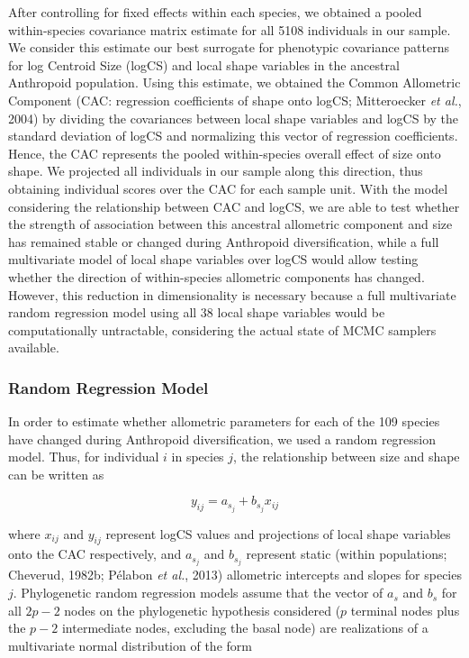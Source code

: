 \documentclass[12pt,twoside]{report}
\begin{document}
After controlling for fixed effects within each species, we obtained a
pooled within-species covariance matrix estimate for all 5108
individuals in our sample. We consider this estimate our best surrogate
for phenotypic covariance patterns for log Centroid Size (logCS) and
local shape variables in the ancestral Anthropoid population. Using this
estimate, we obtained the Common Allometric Component (CAC: regression
coefficients of shape onto logCS; Mitteroecker \emph{et al.}, 2004) by
dividing the covariances between local shape variables and logCS by the
standard deviation of logCS and normalizing this vector of regression
coefficients. Hence, the CAC represents the pooled within-species
overall effect of size onto shape. We projected all individuals in our
sample along this direction, thus obtaining individual scores over the
CAC for each sample unit. With the model considering the relationship
between CAC and logCS, we are able to test whether the strength of
association between this ancestral allometric component and size has
remained stable or changed during Anthropoid diversification, while a
full multivariate model of local shape variables over logCS would allow
testing whether the direction of within-species allometric components
has changed. However, this reduction in dimensionality is necessary
because a full multivariate random regression model using all 38 local
shape variables would be computationally untractable, considering the
actual state of MCMC samplers available.

\subsubsection{Random Regression Model}\label{random-regression-model}

In order to estimate whether allometric parameters for each of the 109
species have changed during Anthropoid diversification, we used a random
regression model. Thus, for individual $i$ in species $j$, the
relationship between size and shape can be written as

\begin{equation}
y_{ij} = a_{s_j} + b_{s_j} x_{ij}
\end{equation}

where $x_{ij}$ and $y_{ij}$ represent logCS values and projections of
local shape variables onto the CAC respectively, and $a_{s_j}$ and
$b_{s_j}$ represent static (within populations; Cheverud, 1982b; Pélabon
\emph{et al.}, 2013) allometric intercepts and slopes for species $j$.
Phylogenetic random regression models assume that the vector of $a_{s}$
and $b_{s}$ for all $2p - 2$ nodes on the phylogenetic hypothesis
considered ($p$ terminal nodes plus the $p - 2$ intermediate nodes,
excluding the basal node) are realizations of a multivariate normal
distribution of the form
\end{document}
